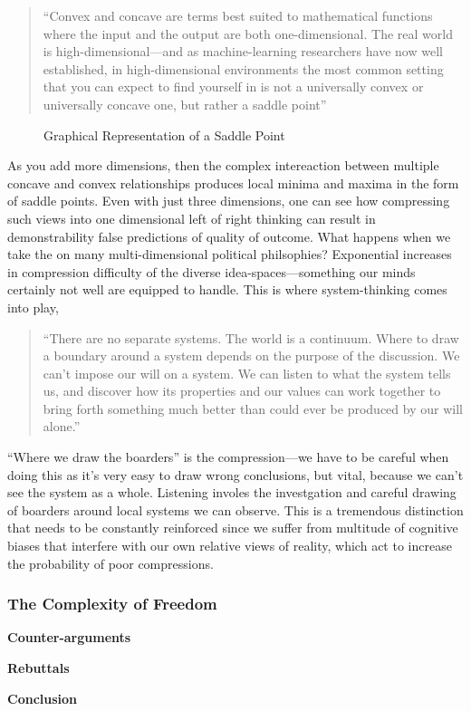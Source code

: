 \documentclass[12pt,a4paper]{article}
\begin{document}
\begin{quotation}
   \color{G-Moon}
   \noindent ``Convex and concave are terms best suited to mathematical functions where the input and the output are both one-dimensional. The real world is high-dimensional---and as machine-learning researchers have now well established, in high-dimensional environments the most common setting that you can expect to find yourself in is not a universally convex or universally concave one, but rather a saddle point''~\cite{vitalik}
\end{quotation}

\begin{figure}[h]
   \centering
   \caption*{Graphical Representation of a Saddle Point}
\end{figure}

As you add more dimensions, then the complex intereaction between multiple concave and convex relationships produces local minima and maxima in the form of saddle points. Even with just three dimensions, one can see how compressing such views into one dimensional left of right thinking can result in demonstrability false predictions of quality of outcome. What happens when we take the on many multi-dimensional political philsophies? Exponential increases in compression difficulty of the diverse idea-spaces---something our minds certainly not well are equipped to handle. This is where system-thinking comes into play,

\begin{quotation}
   \color{G-Moon}
   \noindent``There are no separate systems. The world is a continuum. Where to draw a boundary around a system depends on the purpose of the discussion. We can't impose our will on a system. We can listen to what the system tells us, and discover how its properties and our values can work together to bring forth something much better than could ever be produced by our will alone.''~\cite{systems}
\end{quotation}

``Where we draw the boarders'' is the compression---we have to be careful when doing this as it's very easy to draw wrong conclusions, but vital, because we can't see the system as a whole. Listening involes the investgation and careful drawing of boarders around local systems we can observe. This is a tremendous distinction that needs to be constantly reinforced since we suffer from multitude of cognitive biases that interfere with our own relative views of reality, which act to increase the probability of poor compressions.


\subsubsection{The Complexity of Freedom}
\vspace*{-12pt}


\newpage
\textbf{Counter-arguments}

\textbf{Rebuttals}

\textbf{Conclusion}




\clearpage


\end{document}
